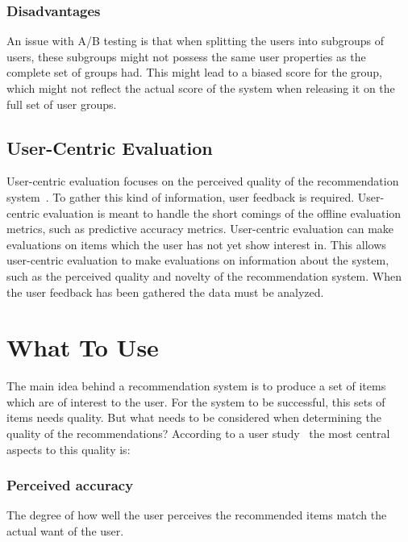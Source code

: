 \subsubsection{Disadvantages}
	An issue with A/B testing is that when splitting the users into subgroups of users, these subgroups might not possess the same user properties as the complete set of groups had.
	This might lead to a biased score for the group, which might not reflect the actual score of the system when releasing it on the full set of user groups.

\subsection{User-Centric Evaluation}
User-centric evaluation focuses on the perceived quality of the recommendation system~\cite{Pu:2011:UEF:2043932.2043962,Knijnenburg:2011:PPS:2043932.2043993}.
To gather this kind of information, user feedback is required.
User-centric evaluation is meant to handle the short comings of the offline evaluation metrics, such as predictive accuracy metrics.
User-centric evaluation can make evaluations on items which the user has not yet show interest in.
This allows user-centric evaluation to make evaluations on information about the system, such as the perceived quality and novelty of the recommendation system.
When the user feedback has been gathered the data must be analyzed.





\section{What To Use}
The main idea behind a recommendation system is to produce a set of items which are of interest to the user.
For the system to be successful, this sets of items needs quality.
But what needs to be considered when determining the quality of the recommendations?
According to a user study~\cite{Pu:2011:UEF:2043932.2043962} the most central aspects to this quality is:


\subsubsection{Perceived accuracy}
The degree of how well the user perceives the recommended items match the actual want of the user.

